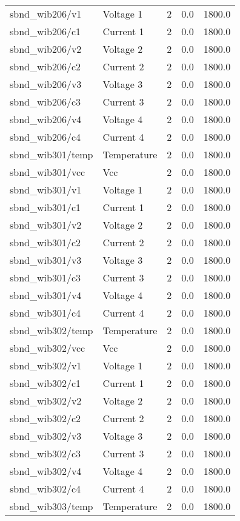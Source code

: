 \begin{center}
\begin{longtable}{l | l l l l }
sbnd\_wib206/v1 & Voltage 1 & 2 & 0.0 & 1800.0\\ 
sbnd\_wib206/c1 & Current 1 & 2 & 0.0 & 1800.0\\ 
sbnd\_wib206/v2 & Voltage 2 & 2 & 0.0 & 1800.0\\ 
sbnd\_wib206/c2 & Current 2 & 2 & 0.0 & 1800.0\\ 
sbnd\_wib206/v3 & Voltage 3 & 2 & 0.0 & 1800.0\\ 
sbnd\_wib206/c3 & Current 3 & 2 & 0.0 & 1800.0\\ 
sbnd\_wib206/v4 & Voltage 4 & 2 & 0.0 & 1800.0\\ 
sbnd\_wib206/c4 & Current 4 & 2 & 0.0 & 1800.0\\ 
sbnd\_wib301/temp & Temperature & 2 & 0.0 & 1800.0\\ 
sbnd\_wib301/vcc & Vcc & 2 & 0.0 & 1800.0\\ 
sbnd\_wib301/v1 & Voltage 1 & 2 & 0.0 & 1800.0\\ 
sbnd\_wib301/c1 & Current 1 & 2 & 0.0 & 1800.0\\ 
sbnd\_wib301/v2 & Voltage 2 & 2 & 0.0 & 1800.0\\ 
sbnd\_wib301/c2 & Current 2 & 2 & 0.0 & 1800.0\\ 
sbnd\_wib301/v3 & Voltage 3 & 2 & 0.0 & 1800.0\\ 
sbnd\_wib301/c3 & Current 3 & 2 & 0.0 & 1800.0\\ 
sbnd\_wib301/v4 & Voltage 4 & 2 & 0.0 & 1800.0\\ 
sbnd\_wib301/c4 & Current 4 & 2 & 0.0 & 1800.0\\ 
sbnd\_wib302/temp & Temperature & 2 & 0.0 & 1800.0\\ 
sbnd\_wib302/vcc & Vcc & 2 & 0.0 & 1800.0\\ 
sbnd\_wib302/v1 & Voltage 1 & 2 & 0.0 & 1800.0\\ 
sbnd\_wib302/c1 & Current 1 & 2 & 0.0 & 1800.0\\ 
sbnd\_wib302/v2 & Voltage 2 & 2 & 0.0 & 1800.0\\ 
sbnd\_wib302/c2 & Current 2 & 2 & 0.0 & 1800.0\\ 
sbnd\_wib302/v3 & Voltage 3 & 2 & 0.0 & 1800.0\\ 
sbnd\_wib302/c3 & Current 3 & 2 & 0.0 & 1800.0\\ 
sbnd\_wib302/v4 & Voltage 4 & 2 & 0.0 & 1800.0\\ 
sbnd\_wib302/c4 & Current 4 & 2 & 0.0 & 1800.0\\ 
sbnd\_wib303/temp & Temperature & 2 & 0.0 & 1800.0\\ 

\end{longtable}
\end{center}
